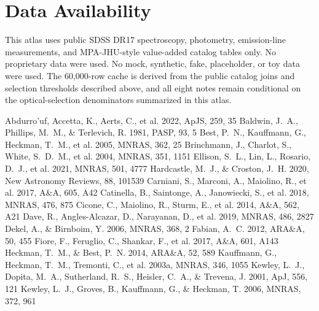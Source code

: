 \documentclass[twocolumn]{aastex631}
\begin{document}
\section*{Data Availability}
This atlas uses public SDSS DR17 spectroscopy, photometry, emission-line measurements, and MPA-JHU-style value-added catalog tables only. No proprietary data were used. No mock, synthetic, fake, placeholder, or toy data were used. The 60,000-row cache is derived from the public catalog joins and selection thresholds described above, and all eight notes remain conditional on the optical-selection denominators summarized in this atlas.


\begin{thebibliography}{}
 Abdurro'uf, Accetta, K., Aerts, C., et al. 2022, ApJS, 259, 35
 Baldwin, J.~A., Phillips, M.~M., \& Terlevich, R. 1981, PASP, 93, 5
 Best, P.~N., Kauffmann, G., Heckman, T.~M., et al. 2005, MNRAS, 362, 25
 Brinchmann, J., Charlot, S., White, S.~D.~M., et al. 2004, MNRAS, 351, 1151
 Ellison, S.~L., Lin, L., Rosario, D.~J., et al. 2021, MNRAS, 501, 4777
 Hardcastle, M.~J., \& Croston, J.~H. 2020, New Astronomy Reviews, 88, 101539
 Carniani, S., Marconi, A., Maiolino, R., et al. 2017, A\&A, 605, A42
 Catinella, B., Saintonge, A., Janowiecki, S., et al. 2018, MNRAS, 476, 875
 Cicone, C., Maiolino, R., Sturm, E., et al. 2014, A\&A, 562, A21
 Dave, R., Angles-Alcazar, D., Narayanan, D., et al. 2019, MNRAS, 486, 2827
 Dekel, A., \& Birnboim, Y. 2006, MNRAS, 368, 2
 Fabian, A.~C. 2012, ARA\&A, 50, 455
 Fiore, F., Feruglio, C., Shankar, F., et al. 2017, A\&A, 601, A143
 Heckman, T.~M., \& Best, P.~N. 2014, ARA\&A, 52, 589
 Kauffmann, G., Heckman, T.~M., Tremonti, C., et al. 2003a, MNRAS, 346, 1055
 Kewley, L.~J., Dopita, M.~A., Sutherland, R.~S., Heisler, C.~A., \& Trevena, J. 2001, ApJ, 556, 121
 Kewley, L.~J., Groves, B., Kauffmann, G., \& Heckman, T. 2006, MNRAS, 372, 961

\end{thebibliography}
\end{document}
